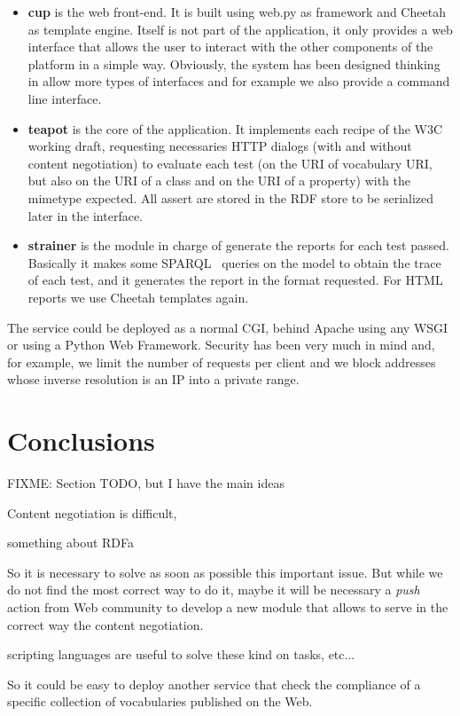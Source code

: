 \begin{itemize}

  \item \textbf{cup} is the web front-end. It is built using web.py as framework
        and Cheetah as template engine. Itself is not part of the application,
        it only provides a web interface that allows the user to interact with
        the other components of the platform in a simple way. Obviously, the
        system has been designed thinking in allow more types of interfaces
        and for example we also provide a command line interface.

  \item \textbf{teapot} is the core of the application. It implements each
        recipe of the W3C working draft, requesting necessaries HTTP dialogs 
        (with and without content negotiation) to evaluate each test (on the 
        URI of vocabulary URI, but also on the URI of a class and on the URI 
        of a property) with the mimetype expected. All assert are stored in
        the RDF store to be serialized later in the interface.

  \item \textbf{strainer} is the module in charge of generate the reports for
        each test passed. Basically it makes some SPARQL~\cite{SPARQL} queries
        on the model to obtain the trace of each test, and it generates the
        report in the format requested. For HTML reports we use Cheetah templates
        again.

\end{itemize}

The service could be deployed as a normal CGI, behind Apache using any WSGI or
using a Python Web Framework. Security has been very much in mind and, for example, 
we limit the number of requests per client and we block addresses whose inverse 
resolution is an IP into a private range.

\section{\label{sec:conclusions}Conclusions}

FIXME: Section TODO, but I have the main ideas

Content negotiation is difficult,

something about RDFa~\cite{Birbeck2006}

So it is necessary to solve as soon as possible this important issue. %
But while we do not find the most correct way to do it, maybe it will be 
necessary a \textit{push} action from Web community to develop a new
module that allows to serve in the correct way the content negotiation.

scripting languages are useful to solve these kind on tasks, etc... 

So it could be easy 
to deploy another service that check the compliance of a specific collection 
of vocabularies published on the Web.
